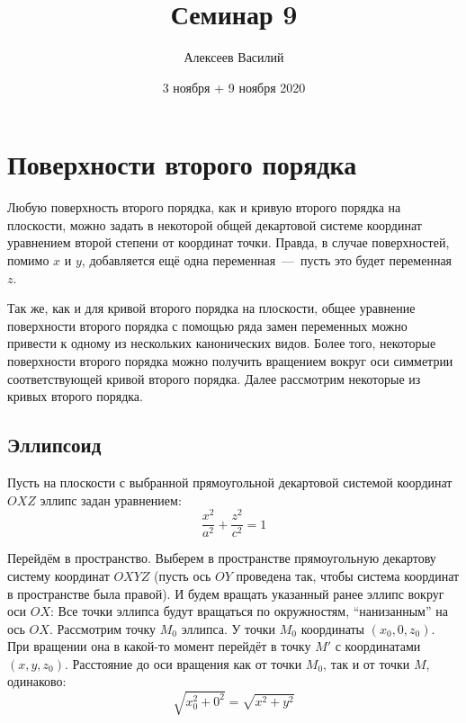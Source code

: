 \documentclass[a4paper,12pt]{article}
\author{Алексеев Василий}
\title{Семинар 9}
\date{3 ноября + 9 ноября 2020}
\begin{document}
  \maketitle
  
  \tableofcontents

  \thispagestyle{empty}
  
  \newpage
  


  \section{Поверхности второго порядка}
  
  Любую поверхность второго порядка, как и кривую второго порядка на плоскости, можно задать в некоторой общей декартовой системе координат уравнением второй степени от координат точки.
  Правда, в случае поверхностей, помимо $x$ и $y$, добавляется ещё одна переменная~---~пусть это будет переменная $z$.
  
  Так же, как и для кривой второго порядка на плоскости, общее уравнение поверхности второго порядка с помощью ряда замен переменных можно привести к одному из нескольких канонических видов.  %
  Более того, некоторые поверхности второго порядка можно получить вращением вокруг оси симметрии соответствующей кривой второго порядка.
  Далее рассмотрим некоторые из кривых второго порядка.
  
  
  \subsection{Эллипсоид}
  
  Пусть на плоскости с выбранной прямоугольной декартовой системой координат $OXZ$ эллипс задан уравнением:
  \[
    \frac{x^2}{a^2} + \frac{z^2}{c^2} = 1
  \]
  
  Перейдём в пространство.
  Выберем в пространстве прямоугольную декартову систему координат $OXYZ$ (пусть ось $OY$ проведена так, чтобы система координат в пространстве была правой).
  И будем вращать указанный ранее эллипс вокруг оси $OX$:
  Все точки эллипса будут вращаться по окружностям, ``нанизанным'' на ось $OX$.
  Рассмотрим точку $M_0$ эллипса.
  У точки $M_0$ координаты $(x_0, 0, z_0)$.
  При вращении она в какой-то момент перейдёт в точку $M'$ с координатами $(x, y, z_0)$.
  Расстояние до оси вращения как от точки $M_0$, так и от точки $M$, одинаково:
  \[
    \sqrt{x_0^2 + 0^2} = \sqrt{x^2 + y^2}
  \]
  
\end{document}
